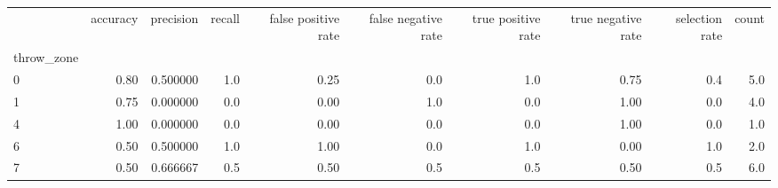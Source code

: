 \begin{tabular}{lrrrrrrrrr}
\toprule
{} &  accuracy &  precision &  recall &  false positive rate &  false negative rate &  true positive rate &  true negative rate &  selection rate &  count \\
throw\_zone &           &            &         &                      &                      &                     &                     &                 &        \\
\midrule
0          &      0.80 &   0.500000 &     1.0 &                 0.25 &                  0.0 &                 1.0 &                0.75 &             0.4 &    5.0 \\
1          &      0.75 &   0.000000 &     0.0 &                 0.00 &                  1.0 &                 0.0 &                1.00 &             0.0 &    4.0 \\
4          &      1.00 &   0.000000 &     0.0 &                 0.00 &                  0.0 &                 0.0 &                1.00 &             0.0 &    1.0 \\
6          &      0.50 &   0.500000 &     1.0 &                 1.00 &                  0.0 &                 1.0 &                0.00 &             1.0 &    2.0 \\
7          &      0.50 &   0.666667 &     0.5 &                 0.50 &                  0.5 &                 0.5 &                0.50 &             0.5 &    6.0 \\
\bottomrule
\end{tabular}

